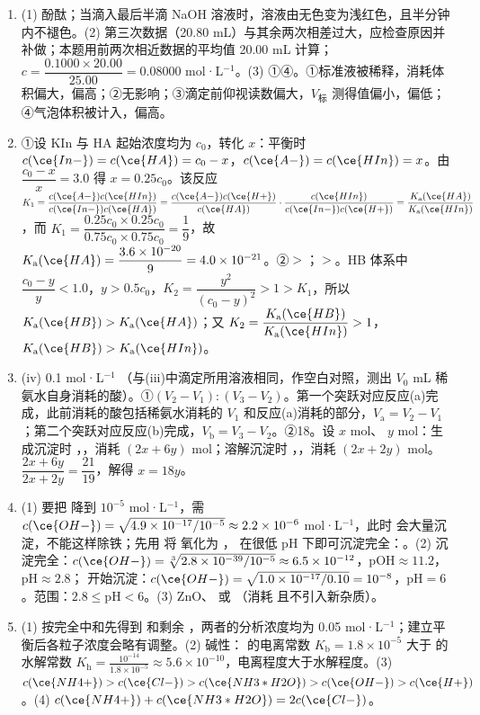 \documentclass[UTF8,a4paper,zihao=5,oneside,openany,fontset=none]{ctexbook}
\newenvironment{jiexilist}{\small\begin{enumerate}[label={\textbf{\arabic*}.},leftmargin=1.6em,itemsep=0.3em,topsep=0.2em]}{\end{enumerate}}
\begin{document}
\begin{jiexilist}
\item (1) 酚酞；当滴入最后半滴 NaOH 溶液时，溶液由无色变为浅红色，且半分钟内不褪色。(2) 第三次数据（20.80 mL）与其余两次相差过大，应检查原因并补做；本题用前两次相近数据的平均值 20.00 mL 计算；$c=\dfrac{0.1000\times20.00}{25.00}=0.08000$ mol·L$^{-1}$。(3) ①④。①标准液被稀释，消耗体积偏大，偏高；②无影响；③滴定前仰视读数偏大，$V_\text{标}$ 测得值偏小，偏低；④气泡体积被计入，偏高。
\item ①设 KIn 与 HA 起始浓度均为 $c_0$，转化 $x$：平衡时 $c(\ce{In-})=c(\ce{HA})=c_0-x$，$c(\ce{A-})=c(\ce{HIn})=x$。由 $\dfrac{c_0-x}{x}=3.0$ 得 $x=0.25c_0$。该反应 $K_1=\dfrac{c(\ce{A-})c(\ce{HIn})}{c(\ce{In-})c(\ce{HA})}=\dfrac{c(\ce{A-})c(\ce{H+})}{c(\ce{HA})}\cdot\dfrac{c(\ce{HIn})}{c(\ce{In-})c(\ce{H+})}=\dfrac{K_\text{a}(\ce{HA})}{K_\text{a}(\ce{HIn})}$，而 $K_1=\dfrac{0.25c_0\times0.25c_0}{0.75c_0\times0.75c_0}=\dfrac19$，故 $K_\text{a}(\ce{HA})=\dfrac{3.6\times10^{-20}}{9}=4.0\times10^{-21}$。②$>$；$>$。HB 体系中 $\dfrac{c_0-y}{y}<1.0$，$y>0.5c_0$，$K_2=\dfrac{y^2}{(c_0-y)^2}>1>K_1$，所以 $K_\text{a}(\ce{HB})>K_\text{a}(\ce{HA})$；又 $K_2=\dfrac{K_\text{a}(\ce{HB})}{K_\text{a}(\ce{HIn})}>1$，$K_\text{a}(\ce{HB})>K_\text{a}(\ce{HIn})$。
\item (iv) 0.1 mol·L$^{-1}$ （与(iii)中滴定所用溶液相同，作空白对照，测出 $V_0$ mL 稀氨水自身消耗的酸）。①$(V_2-V_1):(V_3-V_2)$。第一个突跃对应反应(a)完成，此前消耗的酸包括稀氨水消耗的 $V_1$ 和反应(a)消耗的部分，$V_\text{a}=V_2-V_1$；第二个突跃对应反应(b)完成，$V_\text{b}=V_3-V_2$。②18。设  $x$ mol、 $y$ mol：生成沉淀时 ，，消耗  $(2x+6y)$ mol；溶解沉淀时 ，，消耗 $(2x+2y)$ mol。$\dfrac{2x+6y}{2x+2y}=\dfrac{21}{19}$，解得 $x=18y$。
\item (1) 要把  降到 $10^{-5}$ mol·L$^{-1}$，需 $c(\ce{OH-})=\sqrt{4.9\times10^{-17}/10^{-5}}\approx2.2\times10^{-6}$ mol·L$^{-1}$，此时  会大量沉淀，不能这样除铁；先用  将  氧化为 ， 在很低 pH 下即可沉淀完全：。(2)  沉淀完全：$c(\ce{OH-})=\sqrt[3]{2.8\times10^{-39}/10^{-5}}\approx6.5\times10^{-12}$，pOH$\approx11.2$，pH$\approx2.8$； 开始沉淀：$c(\ce{OH-})=\sqrt{1.0\times10^{-17}/0.10}=10^{-8}$，pH$=6$。范围：$2.8\le$pH$<6$。(3) ZnO、 或 （消耗  且不引入新杂质）。
\item (1) 按完全中和先得到  和剩余 ，两者的分析浓度均为 0.05 mol·L$^{-1}$；建立平衡后各粒子浓度会略有调整。(2) 碱性： 的电离常数 $K_\text{b}=1.8\times10^{-5}$ 大于  的水解常数 $K_\text{h}=\frac{10^{-14}}{1.8\times10^{-5}}\approx5.6\times10^{-10}$，电离程度大于水解程度。(3) $c(\ce{NH4+})>c(\ce{Cl-})>c(\ce{NH3*H2O})>c(\ce{OH-})>c(\ce{H+})$。(4) $c(\ce{NH4+})+c(\ce{NH3*H2O})=2c(\ce{Cl-})$。

\end{jiexilist}
\end{document}

